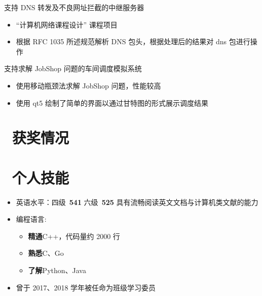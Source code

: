 \documentclass{resume}
\begin{document}
\begin{onehalfspacing}
  支持 DNS 转发及不良网址拦截的中继服务器
  \begin{itemize}
    \item “计算机网络课程设计” 课程项目
    \item 根据 RFC 1035 所述规范解析 DNS 包头，根据处理后的结果对 dns 包进行操作
  \end{itemize}
\end{onehalfspacing}

\begin{onehalfspacing}
  支持求解 JobShop 问题的车间调度模拟系统
  \begin{itemize}
    \item 使用移动瓶颈法求解 JobShop 问题，性能较高
    \item 使用 qt5 绘制了简单的界面以通过甘特图的形式展示调度结果
  \end{itemize}
\end{onehalfspacing}

\section{\faHeartO\ 获奖情况}
\section{\faCogs\ 个人技能}
\begin{itemize}[parsep=0.5ex]
  \item 英语水平：四级\ \textbf{541} \quad 六级\ \textbf{525} \quad 具有流畅阅读英文文档与计算机类文献的能力
  \item 编程语言:
        \begin{itemize}
          \item \textbf{精通}\quad C++，代码量约 2000 行
          \item \textbf{熟悉}\quad C、Go
          \item \textbf{了解}\quad Python、Java
        \end{itemize}
  \item 曾于 2017、2018 学年被任命为班级学习委员
\end{itemize}

%
%
\end{document}
